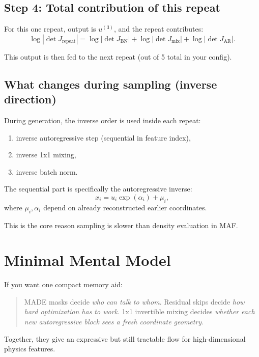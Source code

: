 \documentclass[11pt]{article}
\begin{document}
\subsection*{Step 4: Total contribution of this repeat}
For this one repeat, output is $u^{(3)}$, and the repeat contributes:
\[
\log|\det J_{\text{repeat}}|=
\log|\det J_{\text{BN}}|+
\log|\det J_{\text{mix}}|+
\log|\det J_{\text{AR}}|.
\]

This output is then fed to the next repeat (out of 5 total in your config).

\subsection*{What changes during sampling (inverse direction)}
During generation, the inverse order is used inside each repeat:
\begin{enumerate}[leftmargin=*]
\item inverse autoregressive step (sequential in feature index),
\item inverse 1x1 mixing,
\item inverse batch norm.
\end{enumerate}

The sequential part is specifically the autoregressive inverse:
\[
x_i = u_i\exp(\alpha_i) + \mu_i,
\]
where $\mu_i,\alpha_i$ depend on already reconstructed earlier coordinates.

This is the core reason sampling is slower than density evaluation in MAF.

\section{Minimal Mental Model}
If you want one compact memory aid:

\begin{quote}
MADE masks decide \emph{who can talk to whom}. Residual skips decide
\emph{how hard optimization has to work}. 1x1 invertible mixing decides
\emph{whether each new autoregressive block sees a fresh coordinate geometry}.
\end{quote}

Together, they give an expressive but still tractable flow for high-dimensional
physics features.
\end{document}
